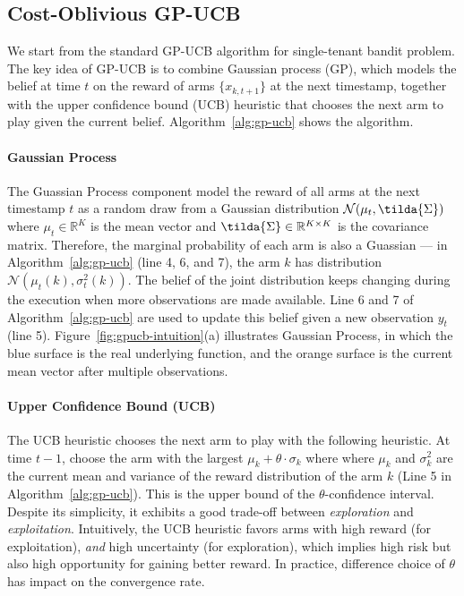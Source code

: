\documentclass[letterpaper]{vldb}
\begin{document}
\vspace{-1em}
\subsection{Cost-Oblivious GP-UCB}

We start from the standard GP-UCB algorithm for single-tenant bandit problem.
The key idea of GP-UCB is to combine Gaussian process (GP),
which models the belief at time $t$ on the reward of arms $\{x_{k,{t+1}}\}$
at the next timestamp, together with the upper confidence bound (UCB) 
heuristic that chooses the next arm to play given the current belief.
Algorithm~\ref{alg:gp-ucb} shows the algorithm.


\vspace{-0.75em}
\paragraph*{Gaussian Process} The Guassian Process component model
the reward of all arms at the next timestamp $t$ as a random draw from a 
Gaussian distribution
$\mathcal{N}(\mu_t, \tilda{\Sigma})$ where $\mu_t \in \mathbb{R}^K$ is the
mean vector and $\tilda{\Sigma} \in \mathbb{R}^{K \times K}$ is the covariance
matrix. Therefore, the marginal probability of each arm is also a Guassian ---
in Algorithm~\ref{alg:gp-ucb} (line 4, 6, and 7), the arm $k$ has distribution
$\mathcal{N}(\mu_t(k), \sigma_t^2(k))$. The belief of the joint distribution
keeps changing during the execution when more observations are made
available. Line 6 and 7 of Algorithm~\ref{alg:gp-ucb} are used to
update this belief given a new observation $y_t$ (line 5).
Figure~\ref{fig:gpucb-intuition}(a) illustrates Gaussian Process, in which
the blue surface is the real underlying function, and the orange
surface is the current mean vector after multiple observations.


\vspace{-0.75em}
\paragraph*{Upper Confidence Bound (UCB)} The UCB heuristic
chooses the next arm to play with the following heuristic. At time $t-1$,
choose the arm with the largest $\mu_k + \theta\cdot\sigma_k$ where 
where $\mu_k$ and $\sigma_k^2$ are the current mean and variance of the 
reward distribution of the arm $k$ (Line 5 in Algorithm~\ref{alg:gp-ucb}). 
This is the upper bound of the $\theta$-confidence interval.
Despite its simplicity, it exhibits a good trade-off between \emph{exploration} and \emph{exploitation}.
Intuitively, the UCB heuristic favors arms with high reward (for exploitation), \emph{and} high uncertainty (for exploration), which implies high risk but also high opportunity for gaining better reward.
In practice, difference choice of $\theta$ has impact on the convergence rate.
\end{document}
